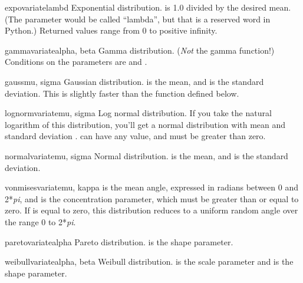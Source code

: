 \begin{funcdesc}{expovariate}{lambd}
  Exponential distribution.   is 1.0 divided by the desired
  mean.  (The parameter would be called ``lambda'', but that is a
  reserved word in Python.)  Returned values range from 0 to
  positive infinity.
\end{funcdesc}

\begin{funcdesc}{gammavariate}{alpha, beta}
  Gamma distribution.  (\emph{Not} the gamma function!)  Conditions on
  the parameters are  and .
\end{funcdesc}

\begin{funcdesc}{gauss}{mu, sigma}
  Gaussian distribution.   is the mean, and  is the
  standard deviation.  This is slightly faster than the
   function defined below.
\end{funcdesc}

\begin{funcdesc}{lognormvariate}{mu, sigma}
  Log normal distribution.  If you take the natural logarithm of this
  distribution, you'll get a normal distribution with mean 
  and standard deviation .   can have any value,
  and  must be greater than zero.
\end{funcdesc}

\begin{funcdesc}{normalvariate}{mu, sigma}
  Normal distribution.   is the mean, and  is the
  standard deviation.
\end{funcdesc}

\begin{funcdesc}{vonmisesvariate}{mu, kappa}
   is the mean angle, expressed in radians between 0 and
  2*\emph{pi}, and  is the concentration parameter, which
  must be greater than or equal to zero.  If  is equal to
  zero, this distribution reduces to a uniform random angle over the
  range 0 to 2*\emph{pi}.
\end{funcdesc}

\begin{funcdesc}{paretovariate}{alpha}
  Pareto distribution.   is the shape parameter.
\end{funcdesc}

\begin{funcdesc}{weibullvariate}{alpha, beta}
  Weibull distribution.   is the scale parameter and
   is the shape parameter.
\end{funcdesc}


\begin{seealso}
\end{seealso}
